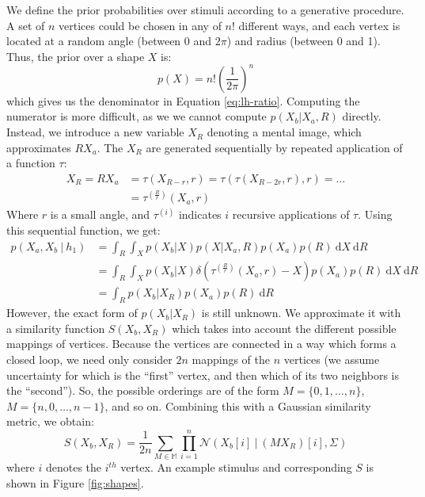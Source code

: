 \documentclass{article} %
\begin{document}
We define the prior probabilities over stimuli according to a
generative procedure. A set of $n$ vertices could be chosen in any of
$n!$ different ways, and each vertex is located at a random angle
(between 0 and $2\pi$) and radius (between 0 and 1). Thus, the prior
over a shape $X$ is:
\begin{equation}
  p(X)=n!\left(\frac{1}{2\pi}\right)^n
  \label{eq:prior}
\end{equation} 
which gives us the denominator in Equation \ref{eq:lh-ratio}.
Computing the numerator is more difficult, as we we cannot compute
$p(X_b\vert X_a, R)$ directly. Instead, we introduce a new variable
$X_R$ denoting a mental image, which approximates $RX_a$. The $X_R$
are generated sequentially by repeated application of a function
$\tau$:
\begin{align}
  X_R=RX_a&=\tau(X_{R-r}, r)=\tau(\tau(X_{R-2r}, r), r)=\ldots{}\nonumber \\
  &=\tau^{(\frac{R}{r})}(X_a, r)
  \label{eq:tau}
\end{align} 
Where $r$ is a small angle, and $\tau^{(i)}$ indicates $i$ recursive
applications of $\tau$. Using this sequential function, we get:
\begin{align}
  p(X_a, X_b\ \vert \ h_1)&=\int_R \int_{X} p(X_b\vert X) p(X\vert X_a, R)p(X_a)p(R)\ \mathrm{d}X\ \mathrm{d}R \nonumber \\
  &= \int_R \int_X p(X_b\vert X)\delta(\tau^{(\frac{R}{r})}(X_a, r)-X)p(X_a)p(R)\ \mathrm{d}X\ \mathrm{d}R \nonumber \\
  &= \int_R p(X_b\vert X_R)p(X_a)p(R)\ \mathrm{d}R
\end{align}
However, the exact form of $p(X_b\vert X_R)$ is still unknown. We
approximate it with a similarity function $S(X_b, X_R)$ which takes
into account the different possible mappings of vertices. Because the
vertices are connected in a way which forms a closed loop, we need
only consider $2n$ mappings of the $n$ vertices (we assume uncertainty
for which is the ``first'' vertex, and then which of its two neighbors
is the ``second''). So, the possible orderings are of the form
$M=\lbrace{}0, 1, \ldots{}, n\rbrace{}$, $M=\lbrace{}n, 0, \ldots{},
n-1\rbrace{}$, and so on. Combining this with a Gaussian similarity
metric, we obtain:
\begin{equation}
  S(X_b, X_R)=\frac{1}{2n}\sum_{M\in\mathbb{M}}\prod_{i=1}^n\mathcal{N}(X_b[i]\ \vert \ (MX_R)[i], \Sigma)
  \label{eq:similarity}
\end{equation}
where $i$ denotes the $i^{th}$ vertex. An example stimulus and
corresponding $S$ is shown in Figure \ref{fig:shapes}.
\end{document}
